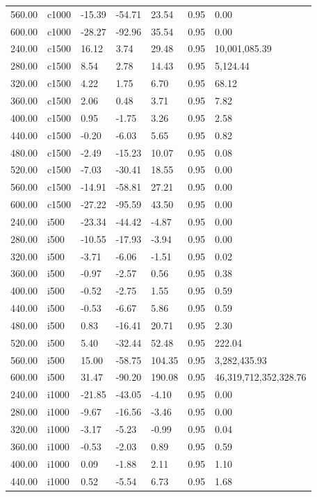 \documentclass[
  man,floatsintext]{apa6}
\begin{document}
\begin{center}
\begin{ThreePartTable}
{\begin{longtable}{lllllll}
560.00 & c1000 & -15.39 & -54.71 & 23.54 & 0.95 & 0.00\\
600.00 & c1000 & -28.27 & -92.96 & 35.54 & 0.95 & 0.00\\
240.00 & c1500 & 16.12 & 3.74 & 29.48 & 0.95 & 10,001,085.39\\
280.00 & c1500 & 8.54 & 2.78 & 14.43 & 0.95 & 5,124.44\\
320.00 & c1500 & 4.22 & 1.75 & 6.70 & 0.95 & 68.12\\
360.00 & c1500 & 2.06 & 0.48 & 3.71 & 0.95 & 7.82\\
400.00 & c1500 & 0.95 & -1.75 & 3.26 & 0.95 & 2.58\\
440.00 & c1500 & -0.20 & -6.03 & 5.65 & 0.95 & 0.82\\
480.00 & c1500 & -2.49 & -15.23 & 10.07 & 0.95 & 0.08\\
520.00 & c1500 & -7.03 & -30.41 & 18.55 & 0.95 & 0.00\\
560.00 & c1500 & -14.91 & -58.81 & 27.21 & 0.95 & 0.00\\
600.00 & c1500 & -27.22 & -95.59 & 43.50 & 0.95 & 0.00\\
240.00 & i500 & -23.34 & -44.42 & -4.87 & 0.95 & 0.00\\
280.00 & i500 & -10.55 & -17.93 & -3.94 & 0.95 & 0.00\\
320.00 & i500 & -3.71 & -6.06 & -1.51 & 0.95 & 0.02\\
360.00 & i500 & -0.97 & -2.57 & 0.56 & 0.95 & 0.38\\
400.00 & i500 & -0.52 & -2.75 & 1.55 & 0.95 & 0.59\\
440.00 & i500 & -0.53 & -6.67 & 5.86 & 0.95 & 0.59\\
480.00 & i500 & 0.83 & -16.41 & 20.71 & 0.95 & 2.30\\
520.00 & i500 & 5.40 & -32.44 & 52.48 & 0.95 & 222.04\\
560.00 & i500 & 15.00 & -58.75 & 104.35 & 0.95 & 3,282,435.93\\
600.00 & i500 & 31.47 & -90.20 & 190.08 & 0.95 & 46,319,712,352,328.76\\
240.00 & i1000 & -21.85 & -43.05 & -4.10 & 0.95 & 0.00\\
280.00 & i1000 & -9.67 & -16.56 & -3.46 & 0.95 & 0.00\\
320.00 & i1000 & -3.17 & -5.23 & -0.99 & 0.95 & 0.04\\
360.00 & i1000 & -0.53 & -2.03 & 0.89 & 0.95 & 0.59\\
400.00 & i1000 & 0.09 & -1.88 & 2.11 & 0.95 & 1.10\\
440.00 & i1000 & 0.52 & -5.54 & 6.73 & 0.95 & 1.68\\

\end{longtable}}
\end{ThreePartTable}
\end{center}
\end{document}

